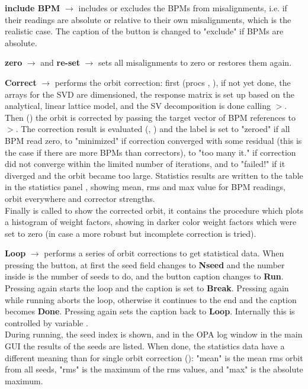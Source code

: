 \documentclass[12pt]{article}
\newcommand\code[1]{{\tt #1}}
\newcommand{\ofld}[1]{\colorbox{black!15}{{{\color{black}\bf #1}}}}
\newcommand\guico[1]{{\color{blue}\code{#1}}}
\newcommand{\unico}[1]{{\color{burntorange}\code{#1}}}
\newcommand{\evcod}[2]{\ofld{#1} $\rightarrow$ \guico{#2}}
\newcommand{\prcod}[2]{\opauni{#1}$>$\unico{#2}}
\newcommand{\opagui}[1]{\colorbox{blue!20}{{\color{black}\code{#1}}}}
\newcommand{\ogui}[1]{\hyperref[#1]{\opagui{#1}}}
\newcommand{\opauni}[1]{\colorbox{orange!30}{{\color{black}\code{#1}}}}
\begin{document}
\evcod{include BPM}{butMonabsClick} includes or excludes the BPMs from misalignments, i.e. if their readings are absolute or relative to their own misalignments, which is the realistic case. The caption of the button is changed to "exclude" if BPMs are absolute.

\evcod{zero}{butZeroClick} and \evcod{re-set}{butSetAgainClick} sets all misalignments to zero or restores them again.

\evcod{Correct}{butCorClick} performs the orbit correction: first (procs \guico{PrepOrbCorr}, \guico{GetResponseMatrix}), if not yet done, the arrays for the SVD are dimensioned, the response matrix is set up based on the analytical, linear lattice model, and the SV decomposition is done calling \prcod{mathlib}{SVDCMP}. \\
Then (\guico{OrbitCorrection}) the orbit is corrected by passing the target vector of BPM references to \prcod{mathlib}{SVBKSB}. 
The correction result is evaluated (\guico{CodStat}, \guico{CodStatCalc}) and the label \guico{LabOrbStat} is set to "zeroed" if all BPM read zero, to "minimized" if correction converged with some residual (this is the case if there are more BPMs than correctors), to "too many it." if correction did not converge within the limited number of iterations, and to "failed!" if it diverged and the orbit became too large. Statistics results are written to the table in the statistics panel \guico{panctr}, showing mean, rms and max value for BPM readings, orbit everywhere and corrector strengths.\\
Finally \guico{MakePlot} is called to show the corrected orbit, it contains the procedure \guico{WeightPlot} which plots a histogram of weight factors, showing in darker color weight factors which were set to zero (in case a more robust but incomplete correction is tried).

\evcod{Loop}{butLoopClick} performs a series of orbit corrections to get statistical data. When pressing the button, at first the seed field changes to \ofld{Nseed} and the number inside is the number of seeds to do, and the button caption changes to \ofld{Run}.\\
Pressing again starts the loop and the caption is set to \ofld{Break}. Pressing again while running aborts the loop, otherwise it continues to the end and the caption becomes \ofld{Done}. Pressing again sets the caption back to \ofld{Loop}. Internally this is controlled by variable \guico{loopstatus}. \\
During running, the seed index is shown, and in the OPA log window in the main GUI \ogui{opamenu} the results of the seeds are listed. When done, the statistics data have a different meaning than for single orbit correction (\guico{LoopStatCalc}): "mean" is the mean rms orbit from all seeds, "rms" is the maximum of the rms values, and "max" is the absolute maximum.
\end{document}
